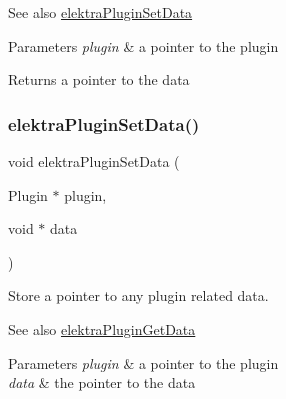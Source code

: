 \begin{DoxySeeAlso}{See also}
\hyperlink{group__plugin_gaf4b941a52ff55d0ca2a9158d90208ef2}{elektra\+Plugin\+Set\+Data} 
\end{DoxySeeAlso}

\begin{DoxyParams}{Parameters}
{\em plugin} & a pointer to the plugin \\
\hline
\end{DoxyParams}
\begin{DoxyReturn}{Returns}
a pointer to the data 
\end{DoxyReturn}
\mbox{\label{group__plugin_gaf4b941a52ff55d0ca2a9158d90208ef2}} 
\subsubsection{\texorpdfstring{elektra\+Plugin\+Set\+Data()}{elektraPluginSetData()}}
{\footnotesize\ttfamily void elektra\+Plugin\+Set\+Data (\begin{DoxyParamCaption}\item[{Plugin $\ast$}]{plugin,  }\item[{void $\ast$}]{data }\end{DoxyParamCaption})}



Store a pointer to any plugin related data. 

\begin{DoxySeeAlso}{See also}
\hyperlink{group__plugin_gaafcf3216b46292f222b8cc7828b4dd20}{elektra\+Plugin\+Get\+Data} 
\end{DoxySeeAlso}

\begin{DoxyParams}{Parameters}
{\em plugin} & a pointer to the plugin \\
\hline
{\em data} & the pointer to the data \\
\hline
\end{DoxyParams}

